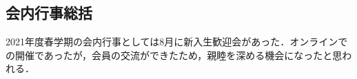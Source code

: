 \subsection*{会内行事総括}


2021年度春学期の会内行事としては8月に新入生歓迎会があった．オンラインでの開催であったが，会員の交流ができたため，親睦を深める機会になったと思われる．
